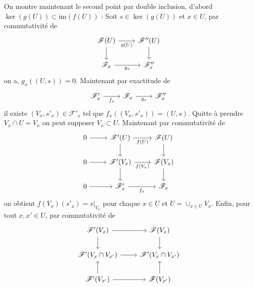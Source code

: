 \documentclass[a4paper,12pt]{article}
\newcommand{\F}{\mathscr F}
\newcommand{\im}{\textrm{im}}
\theoremstyle{plain}
\theoremstyle{definition}
\theoremstyle{remark}
\begin{document}
On montre maintenant le second point par double inclusion, d'abord
$\ker(g(U))\subset \im(f(U))$ : Soit $s\in \ker(g(U))$ et $x\in U$, par
commutativité de 
\[\begin{tikzcd}
	{\F(U)} & {\F''(U)} \\
	{\F_x} & {\F''_x}
	\arrow["{g(U)}"', from=1-1, to=1-2]
	\arrow[from=1-1, to=2-1]
	\arrow[from=1-2, to=2-2]
	\arrow["{g_x}"', from=2-1, to=2-2]
\end{tikzcd}\]
on a, $g_x((U,s))=0$. Maintenant par exactitude de
\[\begin{tikzcd}
	{\F'_x} & {\F_x} & {\F''_x}
	\arrow["{f_x}"', from=1-1, to=1-2]
	\arrow["{g_x}"', from=1-2, to=1-3]
\end{tikzcd}\]
il existe $(V_x, s'_x)\in \F'_x$ tel que $f_x((V_x,s'_x))=(U,s)$. Quitte
à prendre $V_x\cap U=V_x$ on peut supposer $V_x\subset U$. Maintenant
par commutativité de
\[\begin{tikzcd}
	0 & {\F'(U)} & {\F(U)} \\
	{0 } & {\F'(V_x)} & {\F(V_x)} \\
	0 & {\F'_x} & {\F_x}
	\arrow[from=1-1, to=1-2]
	\arrow["{f(U)}"', from=1-2, to=1-3]
	\arrow[from=1-2, to=2-2]
	\arrow[from=1-3, to=2-3]
	\arrow[from=2-1, to=2-2]
	\arrow["{f(V_x)}"', from=2-2, to=2-3]
	\arrow[from=2-2, to=3-2]
	\arrow[from=2-3, to=3-3]
	\arrow[from=3-1, to=3-2]
	\arrow["{f_x}"', from=3-2, to=3-3]
\end{tikzcd}\]
on obtient $f(V_x)(s'_x)=s|_{V_x}$ pour chaque $x\in U$ et 
$U=\cup_{x\in U} V_x$. Enfin, pour tout $x,x'\in U$, par commutativité
de
\[\begin{tikzcd}
	{\F'(V_x)} & {\F(V_x)} \\
	{\F'(V_x\cap V_{x'})} & {\F'(V_x\cap V_{x'})} \\
	{\F'(V_{x'})} & {\F(V_{x'})}
	\arrow[from=1-1, to=1-2]
	\arrow[from=1-1, to=2-1]
	\arrow[from=1-2, to=2-2]
	\arrow[from=2-1, to=2-2]
	\arrow[from=3-1, to=2-1]
	\arrow[from=3-1, to=3-2]
	\arrow[from=3-2, to=2-2]
\end{tikzcd}\]
\end{document}
